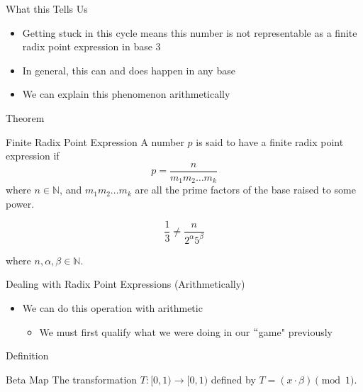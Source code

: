 \documentclass{beamer}
\begin{document}
\begin{frame}{What this Tells Us}
  \begin{itemize}
    \item Getting stuck in this cycle means this number is not representable as a finite radix point expression in base 3 \pause
    \item In general, this can and does happen in any base \pause
    \item We can explain this phenomenon arithmetically
  \end{itemize}
\end{frame}

\begin{frame}{Theorem}
  \begin{block}{Finite Radix Point Expression} \pause
    A number $p$ is said to have a finite radix point expression if $$p=\frac{n}{m_1 m_2\dots m_k}$$ where $n\in\mathbb{N}$, and $m_1 m_2 \dots m_k$ are all the prime factors of the base raised to some power. 
  \end{block}\pause

  \begin{example}[1/3 in Base 10]
    $$\frac{1}{3} \neq \frac{n}{2^\alpha 5^\beta}$$

    where $n,\alpha,\beta\in\mathbb{N}$.
  \end{example}
\end{frame}

\begin{frame}{Dealing with Radix Point Expressions (Arithmetically)}
  \begin{itemize}
    \item We can do this operation with arithmetic \pause
      \begin{itemize}
        \item We must first qualify what we were doing in our $``$game" previously
      \end{itemize}
  \end{itemize}
\end{frame}


\begin{frame}{Definition}
  \begin{block}{Beta Map}
    The transformation $T:[0,1)\to[0,1)$ defined by $T=(x\cdot\beta)\pmod{1}$.
  \end{block}
\end{frame}
\end{document}
